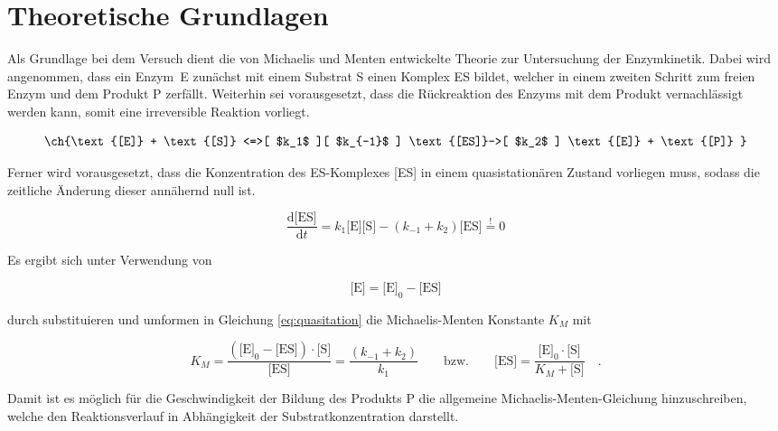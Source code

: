 \setlength\abovedisplayshortskip{20pt}
\setlength\belowdisplayshortskip{20pt}
\setlength\abovedisplayskip{20pt}
\setlength\belowdisplayskip{20pt}

\section{Theoretische Grundlagen \cite{wedler} }

Als Grundlage bei dem Versuch dient die von Michaelis und Menten entwickelte Theorie zur Untersuchung der Enzymkinetik. Dabei wird angenommen, dass ein Enzym~E zunächst mit einem Substrat S einen Komplex ES bildet, welcher in einem zweiten Schritt zum freien Enzym und dem Produkt P zerfällt. Weiterhin sei vorausgesetzt, dass die Rückreaktion des Enzyms mit dem Produkt vernachlässigt werden kann, somit eine irreversible Reaktion vorliegt. 

\begin{equation}
\ch{\text{[E]} + \text{[S]} <=>[ $k_1$ ][ $k_{-1}$ ] \text{[ES]}->[ $k_2$ ] \text{[E]} + \text{[P]} }
\end{equation}


Ferner wird vorausgesetzt, dass die Konzentration des ES-Komplexes [ES] in einem quasistationären Zustand vorliegen muss, sodass die zeitliche Änderung dieser annähernd null ist.

\begin{equation}
\frac{\text{d[ES]}}{\text{d}t} = k_1\text{[E][S]}-\left(k_{-1} + k_2\right)\text{[ES]} \stackrel{!}{=} 0
\label{eq:quasitation}
\end{equation}

Es ergibt sich unter Verwendung von

\begin{equation}
\text{[E]} = \text{[E]}_0-\text{[ES]}
\end{equation}

durch substituieren und umformen in Gleichung \ref{eq:quasitation}  die Michaelis-Menten Konstante $K_M$ mit

\begin{equation}
K_M=\frac{\left(\text{[E]}_0-\text{[ES]}\right)\cdot \text{[S]}}{\text{[ES]}}=\frac{\left(k_{-1} + k_2\right)}{k_1}\quad\quad\text{bzw.}\quad\quad 
\text{[ES]}=\frac{\text{[E]}_0\cdot \text{[S]}}{K_M+\text{[S]}} \quad\text{.}
\label{eq:MMkonstante}
\end{equation}

Damit ist es möglich für die Geschwindigkeit der Bildung des Produkts P die allgemeine Michaelis-Menten-Gleichung hinzuschreiben, welche den Reaktionsverlauf in Abhängigkeit der Substratkonzentration darstellt.

